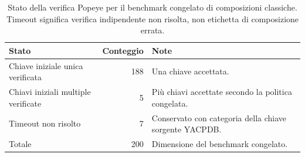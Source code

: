 \begin{table}[H]
    \centering
    \small
    \caption{Stato della verifica Popeye per il benchmark congelato di composizioni classiche. Timeout significa verifica indipendente non risolta, non etichetta di composizione errata.}
    \label{tab:popeye-verification}

    \begin{tabularx}{\textwidth}{>{\raggedright\arraybackslash}p{}r>{\raggedright\arraybackslash}X}
        \toprule
        Stato & Conteggio & Note \\
        \midrule
        Chiave iniziale unica verificata & 188 & Una chiave accettata. \\
        Chiavi iniziali multiple verificate & 5 & Più chiavi accettate secondo la politica congelata. \\
        Timeout non risolto & 7 & Conservato con categoria della chiave sorgente YACPDB. \\
        \midrule
        Totale & 200 & Dimensione del benchmark congelato. \\
        \bottomrule
    \end{tabularx}
\end{table}
